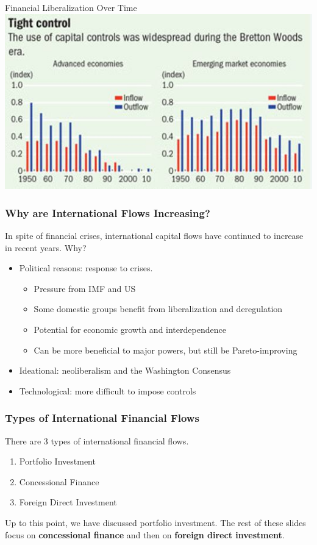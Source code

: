 \documentclass{beamer}
\begin{document}
\begin{frame}{\LARGE Financial Liberalization Over Time}
    \centering
\includegraphics[width=\textwidth,height=0.8\textheight,keepaspectratio]{capital account.JPG}
\end{frame}

\begin{frame} 
	\frametitle{\LARGE{Why are International Flows Increasing?}}
In spite of financial crises, international capital flows have continued to increase in recent years. Why?
	\begin{itemize}
			\item Political reasons: response to crises. \pause 
			\begin{itemize}
			    \item Pressure from IMF and US \pause 
			    \item Some domestic groups benefit from liberalization and deregulation \pause
			    \item Potential for economic growth and interdependence \pause
			    \item Can be more beneficial to major powers, but still be Pareto-improving \pause 
			\end{itemize}
			\item Ideational: neoliberalism and the Washington Consensus \pause 
			\item Technological: more difficult to impose controls 
	\end{itemize}
\end{frame}

\begin{frame} 
	\frametitle{\LARGE{Types of International Financial Flows}}
	There are 3 types of international financial flows.
	\begin{enumerate}
		\item Portfolio Investment
		\item Concessional Finance
		\item Foreign Direct Investment
	\end{enumerate}
	Up to this point, we have discussed portfolio investment. The rest of these slides focus on \textbf{concessional finance} and then on \textbf{foreign direct investment}.
\end{frame}
\end{document}
